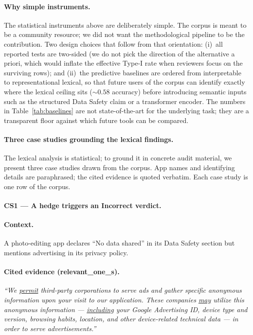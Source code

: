 \documentclass[11pt,a4paper]{article}
\begin{document}
\paragraph{Why simple instruments.}
The statistical instruments above are deliberately simple. The
corpus is meant to be a community resource; we did not want the
methodological pipeline to be the contribution. Two design choices
that follow from that orientation: (i)~all reported tests are
two-sided (we do not pick the direction of the alternative a priori,
which would inflate the effective Type-I rate when reviewers focus
on the surviving rows); and (ii)~the predictive baselines are
ordered from interpretable to representational lexical, so that
future users of the corpus can identify exactly where the lexical
ceiling sits ($\sim0.58$ accuracy) before introducing semantic
inputs such as the structured Data Safety claim or a transformer
encoder. The numbers in Table~\ref{tab:baselines} are not
state-of-the-art for the underlying task; they are a transparent
floor against which future tools can be compared.

\paragraph{Three case studies grounding the lexical findings.}\label{sec:qual}
The lexical analysis is statistical; to ground it in concrete audit
material, we present three case studies drawn from the corpus. App
names and identifying details are paraphrased; the cited evidence is
quoted verbatim. Each case study is one row of the corpus.

\paragraph{CS1 --- A hedge triggers an Incorrect verdict.}
\paragraph{Context.}
A photo-editing app declares ``No data shared'' in its Data Safety
section but mentions advertising in its privacy policy.
\paragraph{Cited evidence (relevant\_one\_s).}
\textit{``We \underline{permit} third-party corporations to serve ads
and gather specific anonymous information upon your visit to our
application. These companies \underline{may} utilize this anonymous
information --- \underline{including} your Google Advertising ID,
device type and version, browsing habits, location, and other
device-related technical data --- in order to serve advertisements.''}
\end{document}
